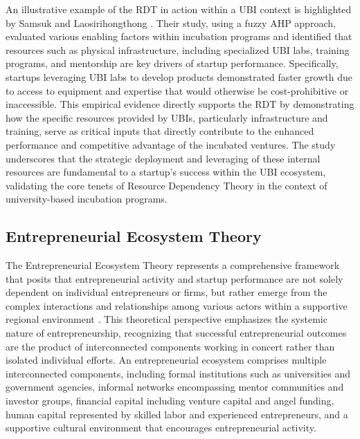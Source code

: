 \documentclass[../Main.tex]{subfiles}
\begin{document}
An illustrative example of the RDT in action within a UBI context is highlighted by Samsuk and Laosirihongthong \cite{samsuk2014fuzzy}. Their study, using a fuzzy AHP approach, evaluated various enabling factors within incubation programs and identified that resources such as physical infrastructure, including specialized UBI labs, training programs, and mentorship are key drivers of startup performance. Specifically, startups leveraging UBI labs to develop products demonstrated faster growth due to access to equipment and expertise that would otherwise be cost-prohibitive or inaccessible. This empirical evidence directly supports the RDT by demonstrating how the specific resources provided by UBIs, particularly infrastructure and training, serve as critical inputs that directly contribute to the enhanced performance and competitive advantage of the incubated ventures. The study underscores that the strategic deployment and leveraging of these internal resources are fundamental to a startup's success within the UBI ecosystem, validating the core tenets of Resource Dependency Theory in the context of university-based incubation programs.


\subsection{Entrepreneurial Ecosystem Theory}

The Entrepreneurial Ecosystem Theory represents a comprehensive framework that posits that entrepreneurial activity and startup performance are not solely dependent on individual entrepreneurs or firms, but rather emerge from the complex interactions and relationships among various actors within a supportive regional environment \cite{spigel2017relational}. This theoretical perspective emphasizes the systemic nature of entrepreneurship, recognizing that successful entrepreneurial outcomes are the product of interconnected components working in concert rather than isolated individual efforts. An entrepreneurial ecosystem comprises multiple interconnected components, including formal institutions such as universities and government agencies, informal networks encompassing mentor communities and investor groups, financial capital including venture capital and angel funding, human capital represented by skilled labor and experienced entrepreneurs, and a supportive cultural environment that encourages entrepreneurial activity.
\end{document}
